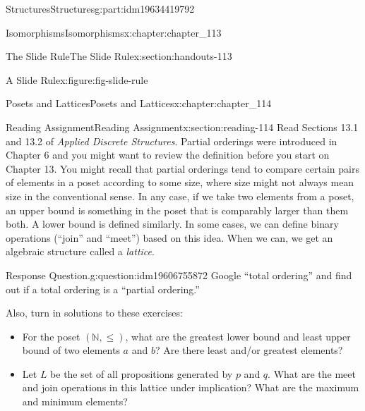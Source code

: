 \documentclass[oneside,10pt,]{book}
\numberwithin{equation}{section}
\begin{document}
\begin{partptx}{Structures}{}{Structures}{}{}{g:part:idm19634419792}
\begin{chapterptx}{Isomorphisms}{}{Isomorphisms}{}{}{x:chapter:chapter_113}
\begin{sectionptx}{The Slide Rule}{}{The Slide Rule}{}{}{x:section:handouts-113}
\begin{figureptx}{A Slide Rule}{x:figure:fig-slide-rule}{}
\begin{image}{0.25}{0.5}{0.25}
\end{image}%
\tcblower
\end{figureptx}%
\end{sectionptx}
\end{chapterptx}
%
\typeout{************************************************}
\typeout{************************************************}
%
\begin{chapterptx}{Posets and Lattices}{}{Posets and Lattices}{}{}{x:chapter:chapter_114}
%
%
%
%
\typeout{************************************************}
\typeout{************************************************}
%
\begin{sectionptx}{Reading Assignment}{}{Reading Assignment}{}{}{x:section:reading-114}
Read Sections 13.1 and 13.2 of \emph{Applied Discrete Structures}. Partial orderings were introduced in Chapter 6 and you might want to review the definition before you start on Chapter 13. You might recall that partial orderings tend to compare certain pairs of elements in a poset according to some size, where size might not always mean size in the conventional sense.  In any case, if we take two elements from a poset, an upper bound is something in the poset that is comparably larger than them both.  A lower bound is defined similarly. In some cases, we can define binary operations (``join'' and ``meet'') based on this idea.  When we can, we get an algebraic structure called a \emph{lattice}.%
\begin{question}{Response Question.}{g:question:idm19606755872}%
Google “total ordering” and find out if a total ordering is a “partial ordering.”%
\end{question}
Also, turn in solutions to these exercises:%
\begin{itemize}[label=\textbullet]
\item{}For the poset \((\mathbb{N},\leq )\), what are the greatest lower bound and least upper bound of two elements \(a\) and \(b\)? Are there least and\slash{}or greatest elements?%
\item{}Let \(L\) be the set of all propositions generated by \(p\) and \(q\).  What are the meet and join operations in this lattice under implication?   What are the maximum and minimum elements?%
\end{itemize}
%
\end{sectionptx}
%
%
\typeout{************************************************}

\end{chapterptx}
\end{partptx}
\end{document}
